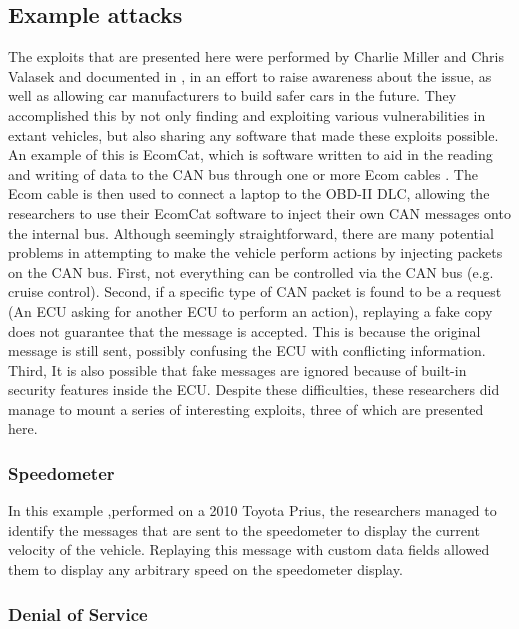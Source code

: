 \subsection{Example attacks}
\label{subsec:example_attacks}

The exploits that are presented here were performed by Charlie Miller and Chris Valasek and documented in , in an effort to raise awareness about the issue, as well as allowing car manufacturers to build safer cars in the future. They accomplished this by not only finding and exploiting various vulnerabilities in extant vehicles, but also sharing any software that made these exploits possible. An example of this is EcomCat, which is software written to aid in the reading and writing of data to the CAN bus through one or more Ecom cables \cite{MillerC}. The Ecom cable is then used to connect a laptop to the OBD-II DLC, allowing the researchers to use their EcomCat software to inject their own CAN messages onto the internal bus. Although seemingly straightforward, there are many potential problems in attempting to make the vehicle perform actions by injecting packets on the CAN bus. First, not everything can be controlled via the CAN bus (e.g. cruise control). Second, if a specific type of CAN packet is found to be a request (An ECU asking for another ECU to perform an action), replaying a fake copy does not guarantee that the message is accepted. This is because the original message is still sent, possibly confusing the ECU with conflicting information. Third, It is also possible that fake messages are ignored because of built-in security features inside the ECU. Despite these difficulties, these researchers did manage to mount a series of interesting exploits, three of which are presented here.

\subsubsection{Speedometer} 
\label{subsec:speedometer}

In this example ,performed on a 2010 Toyota Prius, the researchers managed to identify the messages that are sent to the speedometer to display the current velocity of the vehicle. Replaying this message with custom data fields allowed them to display any arbitrary speed on the speedometer display.

\subsubsection{Denial of Service} 
\label{subsec:denial_of_service}


